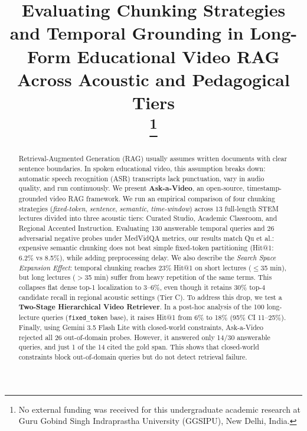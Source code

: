 \documentclass[conference]{IEEEtran}
\begin{document}
\title{Evaluating Chunking Strategies and Temporal Grounding in Long-Form Educational Video RAG Across Acoustic and Pedagogical Tiers\\
\thanks{No external funding was received for this undergraduate academic research at Guru Gobind Singh Indraprastha University (GGSIPU), New Delhi, India.}
}

\author{
}

\maketitle

\begin{abstract}
Retrieval-Augmented Generation (RAG) usually assumes written documents with clear sentence boundaries. In spoken educational video, this assumption breaks down: automatic speech recognition (ASR) transcripts lack punctuation, vary in audio quality, and run continuously. We present \textbf{Ask-a-Video}, an open-source, timestamp-grounded video RAG framework. We run an empirical comparison of four chunking strategies (\textit{fixed-token}, \textit{sentence}, \textit{semantic}, \textit{time-window}) across 13 full-length STEM lectures divided into three acoustic tiers: Curated Studio, Academic Classroom, and Regional Accented Instruction. Evaluating 130 answerable temporal queries and 26 adversarial negative probes under MedVidQA metrics, our results match Qu et al.: expensive semantic chunking does not beat simple fixed-token partitioning (Hit@1: 6.2\% vs 8.5\%), while adding preprocessing delay. We also describe the \textit{Search Space Expansion Effect}: temporal chunking reaches 23\% Hit@1 on short lectures ($\le$35 min), but long lectures ($>$35 min) suffer from heavy repetition of the same terms. This collapses flat dense top-1 localization to 3--6\%, even though it retains 30\% top-4 candidate recall in regional acoustic settings (Tier C). To address this drop, we test a \textbf{Two-Stage Hierarchical Video Retriever}. In a post-hoc analysis of the 100 long-lecture queries (\texttt{fixed\_token} base), it raises Hit@1 from 6\% to 18\% (95\% CI 11--25\%). Finally, using Gemini 3.5 Flash Lite with closed-world constraints, Ask-a-Video rejected all 26 out-of-domain probes. However, it answered only 14/30 answerable queries, and just 1 of the 14 cited the gold span. This shows that closed-world constraints block out-of-domain queries but do not detect retrieval failure.
\end{abstract}
\end{document}
